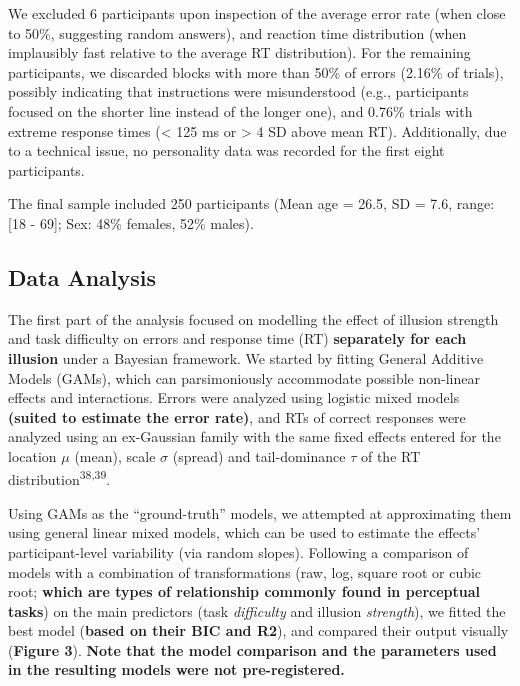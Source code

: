 \documentclass[
  man,floatsintext]{apa6}
\begin{document}
We excluded 6 participants upon inspection of the average error rate (when close to 50\%, suggesting random answers), and reaction time distribution (when implausibly fast relative to the average RT distribution). For the remaining participants, we discarded blocks with more than 50\% of errors (2.16\% of trials), possibly indicating that instructions were misunderstood (e.g., participants focused on the shorter line instead of the longer one), and 0.76\% trials with extreme response times (\textless{} 125 ms or \textgreater{} 4 SD above mean RT). Additionally, due to a technical issue, no personality data was recorded for the first eight participants.

The final sample included 250 participants (Mean age = 26.5, SD = 7.6, range: {[}18 - 69{]}; Sex: 48\% females, 52\% males).

\hypertarget{data-analysis}{%
\subsection{Data Analysis}\label{data-analysis}}

The first part of the analysis focused on modelling the effect of illusion strength and task difficulty on errors and response time (RT) \textbf{separately for each illusion} under a Bayesian framework. We started by fitting General Additive Models (GAMs), which can parsimoniously accommodate possible non-linear effects and interactions. Errors were analyzed using logistic mixed models \textbf{(suited to estimate the error rate)}, and RTs of correct responses were analyzed using an ex-Gaussian family with the same fixed effects entered for the location \(\mu\) (mean), scale \(\sigma\) (spread) and tail-dominance \(\tau\) of the RT distribution\textsuperscript{38,39}.

Using GAMs as the ``ground-truth'' models, we attempted at approximating them using general linear mixed models, which can be used to estimate the effects' participant-level variability (via random slopes). Following a comparison of models with a combination of transformations (raw, log, square root or cubic root; \textbf{which are types of relationship commonly found in perceptual tasks}) on the main predictors (task \emph{difficulty} and illusion \emph{strength}), we fitted the best model (\textbf{based on their BIC and R2}), and compared their output visually (\textbf{Figure 3}). \textbf{Note that the model comparison and the parameters used in the resulting models were not pre-registered.}
\end{document}
